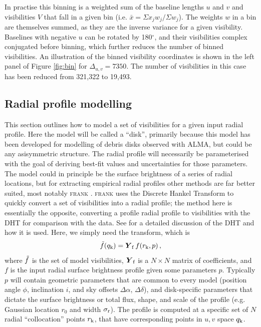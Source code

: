 \documentclass[fleqn,usenatbib]{mnras}
\begin{document}
In practise this binning is a weighted sum of the baseline lengths $u$ and $v$ and visibilities $V$ that fall in a given bin (i.e. $\bar{x} = \Sigma x_j w_j / \Sigma w_j$). The weights $w$ in a bin are themselves summed, as they are the inverse variance for a given visibility. Baselines with negative $u$ can be rotated by 180$^\circ$, and their visibilities complex conjugated before binning, which further reduces the number of binned visibilities. An illustration of the binned visibility coordinates is shown in the left panel of Figure \ref{fig:bin} for $\Delta_{u,v}=7350$. The number of visibilities in this case has been reduced from 321,322 to 19,493.

\subsection{Radial profile modelling}

This section outlines how to model a set of visibilities for a given input radial profile. Here the model will be called a ``disk'', primarily because this model has been developed for modelling of debris disks observed with ALMA, but could be any asisymmetric structure. The radial profile will necessarily be parameterised with the goal of deriving best-fit values and uncertainties for those parameters. The model could in principle be the surface brightness of a series of radial locations, but for extracting empirical radial profiles other methods are far better suited, most notably \textsc{frank} \citep{2020MNRAS.tmp.1491J}. \textsc{frank} uses the Discrete Hankel Transform to quickly convert a set of visibilities into a radial profile; the method here is essentially the opposite, converting a profile radial profile to visibilities with the DHT for comparison with the data. See \citet{2020MNRAS.tmp.1491J} for a detailed discussion of the DHT and how it is used. Here, we simply need the transform, which is
\begin{equation}\label{eq:dht}
    \Tilde{f}(q_{\rm k}) = \boldsymbol{Y}_{\rm f} \, f(r_{\rm k}, p) \, ,
\end{equation}
where $\Tilde{f}$ is the set of model visibilities, $\boldsymbol{Y}_{\rm f}$ is a $N \times N$ matrix of coefficients, and $f$ is the input radial surface brightness profile given some parameters $p$. Typically $p$ will contain geometric parameters that are common to every model (position angle $\phi$, inclination $i$, and sky offsets $\Delta \alpha$, $\Delta \delta$), and disk-specific parameters that dictate the surface brightness or total flux, shape, and scale of the profile (e.g. Gaussian location $r_0$ and width $\sigma_{\rm r}$). The profile is computed at a specific set of $N$ radial ``collocation'' points $r_{\rm k}$, that have corresponding points in $u,v$ space $q_{\rm k}$.
\end{document}
